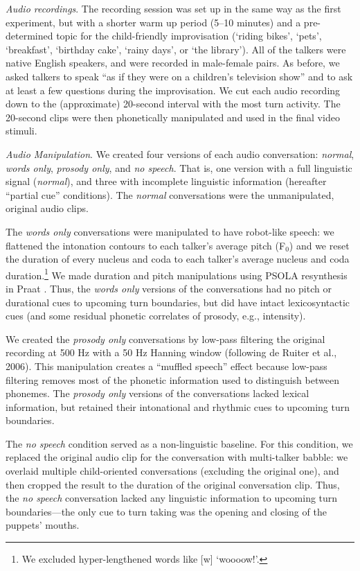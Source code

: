 \documentclass[authoryear, 12pt]{elsarticle}
\begin{document}
\textit{Audio recordings}. The recording session was set up in the same way as the first experiment, but with a shorter warm up period (5--10 minutes) and a pre-determined topic for the child-friendly improvisation (`riding bikes', `pets', `breakfast', `birthday cake', `rainy days', or `the library'). All of the talkers were native English speakers, and were recorded in male-female pairs. As before, we asked talkers to speak ``as if they were on a children's television show'' and to ask at least a few questions during the improvisation. We cut each audio recording down to the (approximate) 20-second interval with the most turn activity. The 20-second clips were then phonetically manipulated and used in the final video stimuli.

\textit{Audio Manipulation}. We created four versions of each audio conversation: \textit{normal}, \textit{words only}, \textit{prosody only}, and \textit{no speech}. That is, one version with a full linguistic signal (\textit{normal}), and three with incomplete linguistic information (hereafter ``partial cue'' conditions). The \textit{normal} conversations were the unmanipulated, original audio clips. 

The \textit{words only} conversations were manipulated to have robot-like speech: we flattened the intonation contours to each talker's average pitch (F$_{0}$) and we reset the duration of every nucleus and coda to each talker's average nucleus and coda duration.\footnote{We excluded hyper-lengthened words like [w] `woooow!'.} We made duration and pitch manipulations using PSOLA resynthesis in Praat \citep{Praat}. Thus, the \textit{words only} versions of the conversations had no pitch or durational cues to upcoming turn boundaries, but did have intact lexicosyntactic cues (and some residual phonetic correlates of prosody, e.g., intensity). 

We created the \textit{prosody only} conversations by low-pass filtering the original recording at 500 Hz with a 50 Hz Hanning window (following de Ruiter et al., 2006). This manipulation creates a ``muffled speech'' effect because low-pass filtering removes most of the phonetic information used to distinguish between phonemes. The \textit{prosody only} versions of the conversations lacked lexical information, but retained their intonational and rhythmic cues to upcoming turn boundaries. 

The \textit{no speech} condition served as a non-linguistic baseline. For this condition, we replaced the original audio clip for the conversation with multi-talker babble: we overlaid multiple child-oriented conversations (excluding the original one), and then cropped the result to the duration of the original conversation clip. Thus, the \textit{no speech} conversation lacked any linguistic information to upcoming turn boundaries---the only cue to turn taking was the opening and closing of the puppets' mouths.
\end{document}

